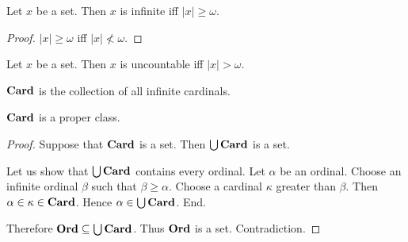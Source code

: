 \documentclass[../set-theory.tex]{subfiles}
\begin{document}
  \begin{forthel}
    \begin{proposition}
      Let $x$ be a set.
      Then $x$ is infinite iff $|x| \geq \omega$.
    \end{proposition}
    \begin{proof}
      $|x| \geq \omega$ iff $|x| \nless \omega$.
    \end{proof}
  \end{forthel}

  \begin{forthel}
    \begin{proposition}
      Let $x$ be a set.
      Then $x$ is uncountable iff $|x| > \omega$.
    \end{proposition}
  \end{forthel}

  \begin{forthel}
    \begin{definition}
      $\mathbf{Card}$ is the collection of all infinite cardinals.
    \end{definition}
  \end{forthel}

  \begin{forthel}
    \begin{proposition}
      $\mathbf{Card}$ is a proper class.
    \end{proposition}
    \begin{proof}
      Suppose that $\mathbf{Card}$ is a set.
      Then $\bigcup \mathbf{Card}$ is a set.

      Let us show that $\bigcup \mathbf{Card}$ contains every ordinal.
        Let $\alpha$ be an ordinal.
        Choose an infinite ordinal $\beta$ such that $\beta \geq \alpha$.
        Choose a cardinal $\kappa$ greater than $\beta$.
        Then $\alpha \in \kappa \in \mathbf{Card}$.
        Hence $\alpha \in \bigcup \mathbf{Card}$.
      End.

      Therefore $\mathbf{Ord} \subseteq \bigcup \mathbf{Card}$.
      Thus $\mathbf{Ord}$ is a set.
      Contradiction.
    \end{proof}
  \end{forthel}
\end{document}
